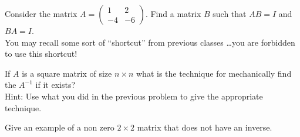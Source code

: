 \begin{problem}
    Consider the matrix $A = \begin{pmatrix} 1 & 2 \\ -4 & -6 \end{pmatrix}$.  Find a
    matrix $B$ such that $AB = I$ and $BA = I$.  \\
    You may recall some sort of ``shortcut'' from previous classes \dots you are forbidden
    to use this shortcut!
\end{problem}

\begin{technique}
    If $A$ is a square matrix of size $n \times n$ what is the technique for mechanically
    find the $A^{-1}$ if it exists? \\
    Hint: Use what you did in the previous problem to give the appropriate technique.
\end{technique}

\begin{problem}
    Give an example of a non zero $2 \times 2$ matrix that does not have an inverse.
\end{problem}
\solution{
    \[ A = \begin{pmatrix} 1 & 0 \\ 0 & 0 \end{pmatrix} \]
}

